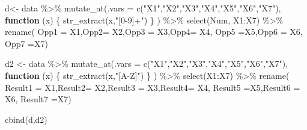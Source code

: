 \documentclass[
]{article}
\newenvironment{Shaded}{\begin{snugshade}}{\end{snugshade}}
\newcommand{\AttributeTok}[1]{\textcolor[rgb]{0.77,0.63,0.00}{#1}}
\newcommand{\ControlFlowTok}[1]{\textcolor[rgb]{0.13,0.29,0.53}{\textbf{#1}}}
\newcommand{\FunctionTok}[1]{\textcolor[rgb]{0.00,0.00,0.00}{#1}}
\newcommand{\NormalTok}[1]{#1}
\newcommand{\OtherTok}[1]{\textcolor[rgb]{0.56,0.35,0.01}{#1}}
\newcommand{\SpecialCharTok}[1]{\textcolor[rgb]{0.00,0.00,0.00}{#1}}
\newcommand{\StringTok}[1]{\textcolor[rgb]{0.31,0.60,0.02}{#1}}
\begin{document}
\begin{Shaded}
\begin{Highlighting}[]
\NormalTok{d}\OtherTok{\textless{}{-}}\NormalTok{ data }\SpecialCharTok{\%\textgreater{}\%} \FunctionTok{mutate\_at}\NormalTok{(}\AttributeTok{.vars =} \FunctionTok{c}\NormalTok{(}\StringTok{"X1"}\NormalTok{,}\StringTok{"X2"}\NormalTok{,}\StringTok{"X3"}\NormalTok{,}\StringTok{"X4"}\NormalTok{,}\StringTok{"X5"}\NormalTok{,}\StringTok{"X6"}\NormalTok{,}\StringTok{"X7"}\NormalTok{), }\ControlFlowTok{function}\NormalTok{ (x) \{}
            \FunctionTok{str\_extract}\NormalTok{(x,}\StringTok{"[0{-}9]+"}\NormalTok{) \} ) }\SpecialCharTok{\%\textgreater{}\%}
  \FunctionTok{select}\NormalTok{(Num, X1}\SpecialCharTok{:}\NormalTok{X7) }\SpecialCharTok{\%\textgreater{}\%}
  \FunctionTok{rename}\NormalTok{( }\AttributeTok{Opp1 =}\NormalTok{ X1,}\AttributeTok{Opp2=}\NormalTok{ X2,}\AttributeTok{Opp3 =}\NormalTok{ X3,}\AttributeTok{Opp4=}\NormalTok{ X4, }\AttributeTok{Opp5 =}\NormalTok{X5,}\AttributeTok{Opp6 =}\NormalTok{ X6, }\AttributeTok{Opp7 =}\NormalTok{X7)  }



\NormalTok{d2 }\OtherTok{\textless{}{-}}\NormalTok{ data }\SpecialCharTok{\%\textgreater{}\%} 
  \FunctionTok{mutate\_at}\NormalTok{(}\AttributeTok{.vars =} \FunctionTok{c}\NormalTok{(}\StringTok{"X1"}\NormalTok{,}\StringTok{"X2"}\NormalTok{,}\StringTok{"X3"}\NormalTok{,}\StringTok{"X4"}\NormalTok{,}\StringTok{"X5"}\NormalTok{,}\StringTok{"X6"}\NormalTok{,}\StringTok{"X7"}\NormalTok{), }\ControlFlowTok{function}\NormalTok{ (x) \{}
            \FunctionTok{str\_extract}\NormalTok{(x,}\StringTok{"[A{-}Z]"}\NormalTok{) \} ) }\SpecialCharTok{\%\textgreater{}\%}
    \FunctionTok{select}\NormalTok{(X1}\SpecialCharTok{:}\NormalTok{X7) }\SpecialCharTok{\%\textgreater{}\%}
  \FunctionTok{rename}\NormalTok{( }\AttributeTok{Result1 =}\NormalTok{ X1,}\AttributeTok{Result2=}\NormalTok{ X2,}\AttributeTok{Result3 =}\NormalTok{ X3,}\AttributeTok{Result4=}\NormalTok{ X4, }\AttributeTok{Result5 =}\NormalTok{X5,}\AttributeTok{Result6 =}\NormalTok{ X6, }\AttributeTok{Result7 =}\NormalTok{X7)  }

  \FunctionTok{cbind}\NormalTok{(d,d2)}
\end{Highlighting}
\end{Shaded}
\end{document}
